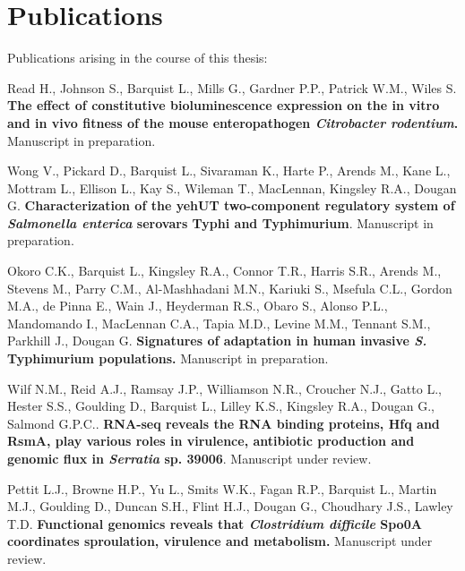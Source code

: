 \chapter{Publications}

Publications arising in the course of this thesis:

\itemize

\item{Read H., Johnson S., Barquist L., Mills G., Gardner P.P., Patrick W.M., Wiles S. \textbf{The effect of constitutive bioluminescence expression on the in vitro and in vivo fitness of the mouse enteropathogen \textit{Citrobacter rodentium}.} Manuscript in preparation.}

\item{Wong V., Pickard D., Barquist L., Sivaraman K., Harte P., Arends M., Kane L., Mottram L., Ellison L., Kay S., Wileman T., MacLennan, Kingsley R.A., Dougan G.  \textbf{Characterization of the yehUT two-component regulatory system of \textit{Salmonella enterica} serovars Typhi and Typhimurium}. Manuscript in preparation.}

\item{Okoro C.K., Barquist L., Kingsley R.A., Connor T.R., Harris S.R., Arends M., Stevens M., Parry C.M., Al-Mashhadani M.N., Kariuki S., Msefula C.L., Gordon M.A., de Pinna E., Wain J., Heyderman R.S., Obaro S., Alonso P.L., Mandomando I., MacLennan C.A., Tapia M.D., Levine M.M., Tennant S.M., Parkhill J., Dougan G.  \textbf{Signatures of adaptation in human invasive \textit{S.} Typhimurium populations.} Manuscript in preparation.} 

\item{Wilf N.M., Reid A.J., Ramsay J.P., Williamson N.R., Croucher N.J., Gatto L., Hester S.S., Goulding D., Barquist L., Lilley K.S., Kingsley R.A., Dougan G., Salmond G.P.C.. \textbf{RNA-seq reveals the RNA binding proteins, Hfq and RsmA, play various roles in virulence, antibiotic production and genomic flux in \textit{Serratia} sp. 39006}. Manuscript under review.}

\newpage

\item{Pettit L.J., Browne H.P., Yu L., Smits W.K., Fagan R.P., Barquist L., Martin M.J., Goulding D., Duncan S.H., Flint H.J., Dougan G., Choudhary J.S., Lawley T.D. \textbf{Functional genomics reveals that \textit{Clostridium difficile} Spo0A coordinates sproulation, virulence and metabolism.} Manuscript under review.}

